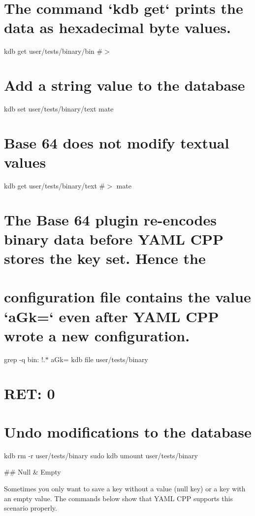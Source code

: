 \hypertarget{autotoc_md865_autotoc_md921}{}\section{The command `kdb get` prints the data as hexadecimal byte values.}\label{autotoc_md865_autotoc_md921}
kdb get user/tests/binary/bin \#$>$ \hypertarget{autotoc_md865_autotoc_md922}{}\section{Add a string value to the database}\label{autotoc_md865_autotoc_md922}
kdb set user/tests/binary/text mate \hypertarget{autotoc_md865_autotoc_md923}{}\section{Base 64 does not modify textual values}\label{autotoc_md865_autotoc_md923}
kdb get user/tests/binary/text \#$>$ mate\hypertarget{autotoc_md865_autotoc_md924}{}\section{The Base 64 plugin re-\/encodes binary data before Y\+A\+M\+L C\+P\+P stores the key set. Hence the}\label{autotoc_md865_autotoc_md924}
\hypertarget{autotoc_md865_autotoc_md925}{}\section{configuration file contains the value `a\+Gk=` even after Y\+A\+M\+L C\+P\+P wrote a new configuration.}\label{autotoc_md865_autotoc_md925}
grep -\/q \textquotesingle{}bin\+: !.$\ast$ a\+Gk=\textquotesingle{} {\ttfamily kdb file user/tests/binary} \hypertarget{autotoc_md865_autotoc_md926}{}\section{R\+E\+T\+: 0}\label{autotoc_md865_autotoc_md926}
\hypertarget{autotoc_md865_autotoc_md927}{}\section{Undo modifications to the database}\label{autotoc_md865_autotoc_md927}
kdb rm -\/r user/tests/binary sudo kdb umount user/tests/binary 
\begin{DoxyCode}
## Null & Empty

Sometimes you only want to save a key without a value (null key) or a key with an empty value. The commands
       below show that YAML CPP supports this scenario properly.
\end{DoxyCode}
